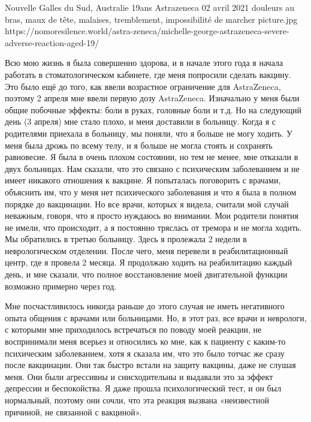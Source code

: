           {Nouvelle Galles du Sud, Australie}
          {19ans}
          {Astrazeneca}
          {02 avril 2021}
          {douleurs au bras, maux de tête, malaises, tremblement, impossibilité de marcher}
          {picture.jpg}
          {https://nomoresilence.world/astra-zeneca/michelle-george-astrazeneca-severe-adverse-reaction-aged-19/}
          {

Всю мою жизнь я была совершенно здорова, и в начале этого года я начала работать
в стоматологическом кабинете, где меня попросили сделать вакцину. Это было ещё
до того, как ввели возрастное ограничение для AstraZeneca, поэтому 2 апреля мне
ввели первую дозу AstraZeneca. Изначально у меня были общие побочные эффекты:
боли в руках, головные боли и т.д. Но на следующий день (3 апреля) мне стало
плохо, и меня доставили в больницу. Когда я с родителями приехала в больницу, мы
поняли, что я больше не могу ходить. У меня была дрожь по всему телу, и я больше
не могла стоять и сохранять равновесие. Я была в очень плохом состоянии, но тем
не менее, мне отказали в двух больницах. Нам сказали, что это связано с
психическим заболеванием и не имеет никакого отношения к вакцине. Я попыталась
поговорить с врачами, объяснить им, что у меня нет психического заболевания и
что я была в полном порядке до вакцинации. Но все врачи, которых я видела,
считали мой случай неважным, говоря, что я просто нуждаюсь во внимании. Мои
родители понятия не имели, что происходит, а я постоянно тряслась от тремора и
не могла ходить. Мы обратились в третью больницу. Здесь я пролежала 2 недели в
неврологическом отделении. После чего, меня перевели в реабилитационный центр,
где я провела 2 месяца. Я продолжаю ходить на реабилитацию каждый день, и мне
сказали, что полное восстановление моей двигательной функции возможно примерно
через год.

Мне посчастливилось никогда раньше до этого случая не иметь негативного опыта
общения с врачами или больницами. Но, в этот раз, все врачи и неврологи, с
которыми мне приходилось встречаться по поводу моей реакции, не воспринимали
меня всерьез и относились ко мне, как к пациенту с каким-то психическим
заболеванием, хотя я сказала им, что это было тотчас же сразу после
вакцинации. Они так быстро встали на защиту вакцины, даже не слушая меня. Они
были агрессивны и снисходительны и выдавали это за эффект депрессии и
беспокойства. Я даже прошла психологический тест, и он был нормальный, поэтому
они сочли, что эта реакция вызвана «неизвестной причиной, не связанной с
вакциной».

}
